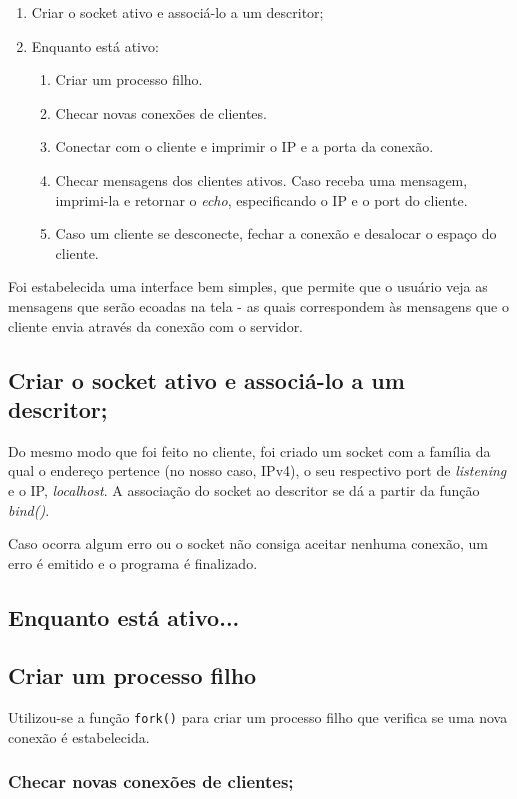 \documentclass[10pt,twocolumn,letterpaper]{article}
\begin{document}
\begin{enumerate}
    \item Criar o socket ativo e associá-lo a um descritor;
    \item Enquanto está ativo:
    \begin{enumerate}
        \item Criar um processo filho.
        \item Checar novas conexões de clientes.
        \item Conectar com o cliente e imprimir o IP e a porta da conexão.
        \item Checar mensagens dos clientes ativos. Caso receba uma mensagem, imprimi-la e retornar o \textit{echo}, especificando o IP e o port do cliente.
        \item Caso um cliente se desconecte, fechar a conexão e desalocar o espaço do cliente.
    \end{enumerate}
\end{enumerate}

    Foi estabelecida uma interface bem simples, que permite que o usuário veja as mensagens que serão ecoadas na tela - as quais correspondem às mensagens que o cliente envia através da conexão com o servidor.

\subsection{Criar o socket ativo e associá-lo a um descritor;}

Do mesmo modo que foi feito no cliente, foi criado um socket com a família da qual o endereço pertence (no nosso caso, IPv4), o seu respectivo port de \textit{listening} e o IP, \textit{localhost}. A associação do socket ao descritor se dá a partir da função \textit{bind()}.

Caso ocorra algum erro ou o socket não consiga aceitar nenhuma conexão, um erro é emitido e o programa é finalizado.

\subsection{Enquanto está ativo...}
\subsection{Criar um processo filho}
Utilizou-se a função \texttt{fork()} para criar um processo filho que verifica se uma nova conexão é estabelecida.
\subsubsection{Checar novas conexões de clientes;}
\end{document}
